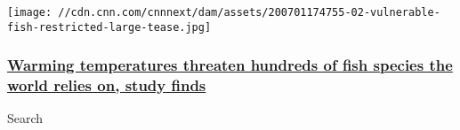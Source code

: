 \href{/2020/07/02/weather/fish-vulnerable-ocean-warming-climate-change-scn/index.html}{}

\texttt{[image: //cdn.cnn.com/cnnnext/dam/assets/200701174755-02-vulnerable-fish-restricted-large-tease.jpg]}

\hypertarget{warming-temperatures-threaten-hundreds-of-fish-species-the-world-relies-on-study-finds}{%
\subsubsection{\texorpdfstring{\href{/2020/07/02/weather/fish-vulnerable-ocean-warming-climate-change-scn/index.html}{Warming
temperatures threaten hundreds of fish species the world relies on,
study
finds}}{Warming temperatures threaten hundreds of fish species the world relies on, study finds}}\label{warming-temperatures-threaten-hundreds-of-fish-species-the-world-relies-on-study-finds}}

Search

